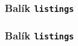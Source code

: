 \subsubsection{Balík \texttt{listings}}
\begin{frame}
	\frametitle{Balík \texttt{listings}}
	\UnderConstruction
\end{frame}

\endinput
